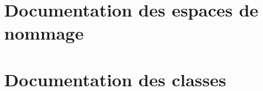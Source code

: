 \documentclass[twoside]{book}
\newcommand{\+}{\discretionary{\mbox{\scriptsize$\hookleftarrow$}}{}{}}
\newcommand{\clearemptydoublepage}{%
  \newpage{\pagestyle{empty}\cleardoublepage}%
}
\begin{document}
\chapter{Documentation des espaces de nommage}







\chapter{Documentation des classes}


















\backmatter
\newpage
{}
\clearemptydoublepage
{}
\printindex
\end{document}
